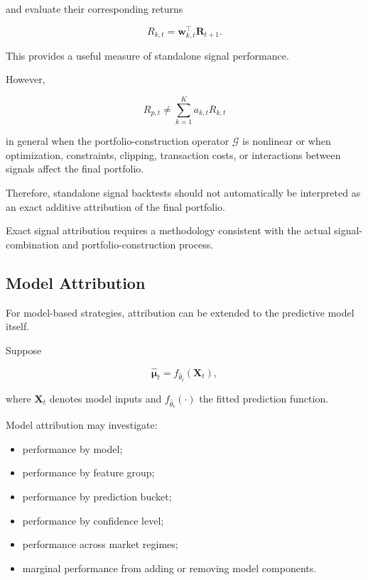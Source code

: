 \documentclass[11pt,a4paper]{article}
\begin{document}
and evaluate their corresponding returns

\begin{equation}
R_{k,t}
=
\mathbf{w}_{k,t}^\top
\mathbf{R}_{t+1}.
\end{equation}

This provides a useful measure of standalone signal performance.

However,

\begin{equation}
\boxed{
R_{p,t}
\neq
\sum_{k=1}^{K}
a_{k,t}R_{k,t}
}
\end{equation}

in general when the portfolio-construction operator $\mathcal{G}$ is nonlinear
or when optimization, constraints, clipping, transaction costs, or interactions
between signals affect the final portfolio.

Therefore, standalone signal backtests should not automatically be interpreted
as an exact additive attribution of the final portfolio.

Exact signal attribution requires a methodology consistent with the actual
signal-combination and portfolio-construction process.


\subsection{Model Attribution}

For model-based strategies, attribution can be extended to the predictive model
itself.

Suppose

\begin{equation}
\widehat{\boldsymbol{\mu}}_t
=
f_{\widehat{\theta}_t}
\left(
\mathbf{X}_t
\right),
\end{equation}

where $\mathbf{X}_t$ denotes model inputs and
$f_{\widehat{\theta}_t}(\cdot)$ the fitted prediction function.

Model attribution may investigate:

\begin{itemize}
    \item performance by model;
    \item performance by feature group;
    \item performance by prediction bucket;
    \item performance by confidence level;
    \item performance across market regimes;
    \item marginal performance from adding or removing model components.
\end{itemize}
\end{document}
